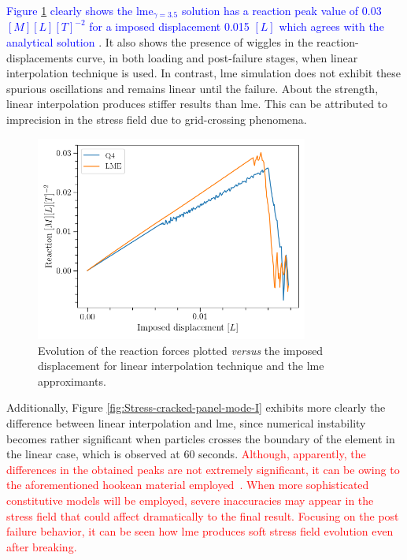\documentclass[preprint,12pt,a4paper]{elsarticle}
\newcommand{\PNA}[1]{
  \textcolor{red}{{#1}}
}
\newcommand{\MMP}[1]{
  \textcolor{blue}{{#1}}
}
\begin{document}
\MMP{Figure \ref{fig:Reactions-cracked-panel-mode-I} clearly shows the
\acrshort{lme}$_{\gamma = 3.5}$ solution has a reaction peak value of 0.03 $[M] [L]
[T]^{-2}$ for a imposed displacement 0.015 $[L]$ which agrees with the
analytical solution \cite{Pandolfi_2012}}. It also shows the presence
of wiggles in the reaction-displacements curve, in both loading and
post-failure stages, when linear interpolation technique is used. In
contrast, \acrshort{lme} simulation does not exhibit these spurious
oscillations and remains linear until the failure. About the strength,
linear interpolation produces stiffer results than
\acrshort{lme}. This can be attributed to imprecision in the stress
field due to grid-crossing phenomena.\\
\begin{figure}
  \centering
  \includegraphics[width=0.8\textwidth]{Figure-Reactions-Mode-I}
  \caption{Evolution of the reaction forces plotted \textit{versus}
    the imposed displacement for linear interpolation technique and
    the \acrshort{lme} approximants.}
  \label{fig:Reactions-cracked-panel-mode-I}
\end{figure}
Additionally, Figure \ref{fig:Stress-cracked-panel-mode-I}
exhibits more clearly the difference between linear interpolation and
\acrshort{lme}, since numerical instability becomes rather significant
when particles crosses the boundary of the element in the linear
case, which is observed at 60 seconds. \PNA{Although, apparently, the
  differences in the obtained peaks are not extremely significant, it
  can be owing to the aforementioned hookean material
  employed~\cite{Zhang_EE_2020}. When more sophisticated constitutive
  models will be employed, severe inaccuracies may appear in the
  stress field that could affect dramatically to the final 
  result. Focusing on the post failure behavior, it can be seen how
  \acrshort{lme} produces soft stress field evolution even after
  breaking.} 
\end{document}
